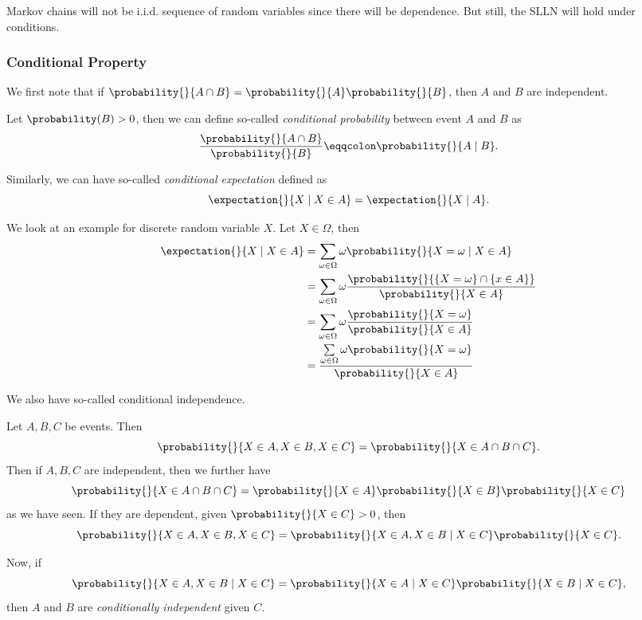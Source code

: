 \begin{note}
	Markov chains will not be i.i.d. sequence of random variables since there will be dependence. But still, the SLLN will hold under conditions.
\end{note}

\subsubsection{Conditional Property}
\begin{prev}
	We first note that if \(\probability{}{A\cap B} = \probability{}{A} \probability{}{B} \), then \(A\) and \(B\) are independent.
\end{prev}

\begin{definition}
	Let \(\probability(B)>0\), then we can define so-called \emph{conditional probability} between event \(A\) and \(B\) as
	\[
		\frac{\probability{}{A\cap B}}{\probability{}{B}} \eqqcolon \probability{}{A \mid B}.
	\]
\end{definition}

\begin{definition}
	Similarly, we can have so-called \emph{conditional expectation} defined as
	\[
		\expectation{}{X \mid X\in A} = \expectation{}{X \mid A}.
	\]
\end{definition}

\begin{eg}
	We look at an example for discrete random variable \(X\). Let \(X\in \Omega\), then
	\[
		\begin{split}
			\expectation{}{X \mid X\in A} &= \sum\limits_{\omega\in \Omega} \omega\probability{}{X = \omega \mid X\in A}\\
			&=\sum\limits_{\omega\in \Omega} \omega \frac{\probability{}{\left\{X = \omega\right\}\cap \left\{x\in A\right\}}}{\probability{}{X\in A} }\\
			&=\sum\limits_{\omega\in \Omega} \omega \frac{\probability{}{X = \omega}}{\probability{}{X\in A} }\\
			&=\frac{\sum\limits_{\omega\in \Omega} \omega \probability{}{X = \omega}}{\probability{}{X\in A}}
		\end{split}
	\]
\end{eg}

We also have so-called conditional independence.
\begin{definition}
	Let \(A, B, C\) be events. Then
	\[
		\probability{}{X\in A, X\in B, X\in C} = \probability{}{X\in A\cap B\cap C}.
	\]
	Then if \(A, B,  C\) are independent, then we further have
	\[
		\probability{}{X\in A\cap B\cap C}= \probability{}{X\in A}\probability{}{X\in B}\probability{}{X\in C}
	\]
	as we have seen. If they are dependent, given \(\probability{}{X\in C}>0\), then
	\[
		\probability{}{X\in A, X\in B, X\in C} = \probability{}{X\in A, X\in B \mid X\in C}\probability{}{X\in C}.
	\]

	Now, if
	\[
		\probability{}{X\in A, X\in B \mid X\in C} = \probability{}{X\in A \mid X\in C}\probability{}{X\in B \mid X\in C},
	\]
	then \(A\) and \(B\) are \emph{conditionally independent} given \(C\).
\end{definition}

